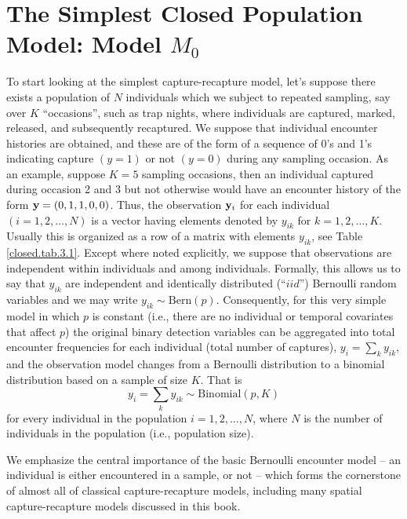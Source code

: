 \section{The Simplest Closed Population Model: Model $M_0$}

To start looking at the simplest capture-recapture model, let's suppose
there exists a population of $N$ individuals which we
subject to repeated sampling, say over $K$ ``occasions'', such as trap nights, where individuals
are captured, marked, released, and subsequently recaptured.  We suppose that
individual encounter histories are obtained, and these are of the form
of a sequence of 0's and 1's indicating capture $(y=1)$ or not $(y=0)$
during any sampling occasion.%
As an example, suppose
$K=5$ sampling occasions, then an individual captured during occasion %
2 and 3 but not otherwise would have an encounter history of the form
${\bf y}=(0,1,1,0,0)$. Thus, the observation ${\bf y}_{i}$ for each
individual $(i=1,2,\hdots,N)$ is a vector having elements denoted by $y_{ik}$ for
$k=1,2,\hdots,K$. Usually this is organized as a row of a matrix with
elements $y_{ik}$, see Table \ref{closed.tab.3.1}. Except where noted
explicitly, we suppose that observations are independent within
individuals and among individuals.  Formally, this allows us to say
that $y_{ik}$ are independent and identically distributed (``$iid$'')
Bernoulli random variables and we may write $y_{ik}
\sim \mbox{Bern}(p)$.  Consequently, for this very simple model in
which $p$ is constant (i.e., there are no individual or temporal
covariates that affect $p$) the original binary detection variables
can be aggregated into total encounter frequencies for each individual
(total number of captures), $y_{i} = \sum_{k} y_{ik}$, and the
observation model changes from a Bernoulli distribution to a
binomial distribution based on a sample of size $K$. That is
\[
y_{i}  = \sum_{k} y_{ik} \sim \mbox{Binomial}(p,K)
\]
for every individual in the population $i=1,2,\ldots,N$, where $N$ is
the number of individuals in the population (i.e., population size).

We emphasize the central importance of the basic Bernoulli encounter model
-- an individual is either encountered in a sample, or not --
 which forms
the cornerstone of almost all of classical
capture-recapture models, including many spatial capture-recapture
models discussed in this book.

